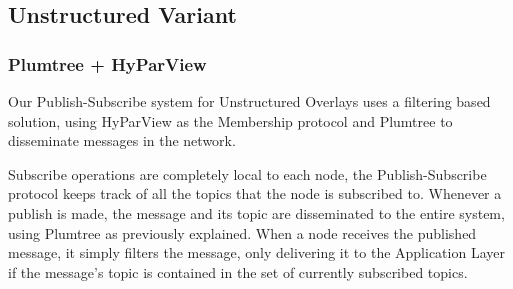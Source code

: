 \documentclass[sigconf]{acmart}
\begin{document}
\subsection{Unstructured Variant}

\subsubsection{Plumtree + HyParView} %

Our Publish-Subscribe system for Unstructured Overlays uses a filtering based solution, using HyParView as the Membership protocol and Plumtree to disseminate messages in the network.

Subscribe operations are completely local to each node, the Publish-Subscribe protocol keeps track of all the topics that the node is subscribed to.
Whenever a publish is made, the message and its topic are disseminated to the entire system, using Plumtree as previously explained. When a node receives the published message, it simply filters the message, only delivering it to the Application Layer if the message's topic is contained in the set of currently subscribed topics.
\end{document}
